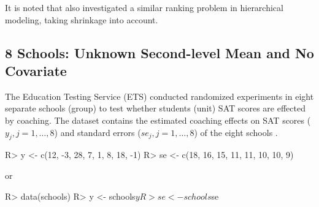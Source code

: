 \documentclass[article]{jss}
\begin{document}



It is noted that \cite{1995} also investigated a similar ranking problem in hierarchical modeling, taking shrinkage into account.


\subsection[Unknown Second-level Mean and No Covariate]{8 Schools: Unknown Second-level Mean and No Covariate}

The Education Testing Service (ETS) conducted randomized experiments in eight separate schools (group) to test whether students (unit) SAT scores are effected by coaching. The dataset contains the estimated coaching effects on SAT scores ($y_{j}, j=1, \ldots, 8$) and standard errors ($se_{j}, j=1, \ldots, 8$) of the eight schools \citep{1981}.
\begin{CodeChunk}
\begin{CodeInput}
R> y  <- c(12, -3, 28,  7,  1,  8, 18, -1)
R> se <- c(18, 16, 15, 11, 11, 10, 10,  9)
\end{CodeInput}
\end{CodeChunk}
or
\begin{CodeChunk}
\begin{CodeInput}
R> data(schools)
R> y  <- schools$y
R> se <- schools$se
\end{CodeInput}
\end{CodeChunk}
\end{document}
